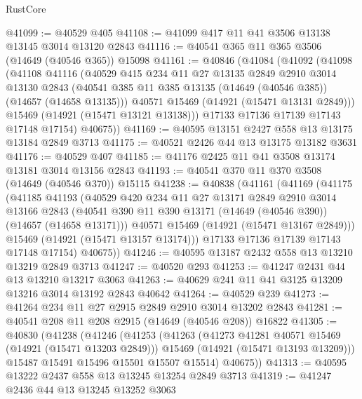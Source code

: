 \begin{lexlean}{RustCore}
\begin{coremodule}
@41099 := @40529 @405
@41108 := @41099 @417 @11 @41 @3506 @13138 @13145 @3014 @13120 @2843
@41116 := @40541 @365 @11 @365 @3506 (@14649 (@40546 @365)) @15098
@41161 := @40846
    (@41084
      (@41092
        (@41098
          (@41108
            @41116
            (@40529
              @415
              @234
              @11
              @27
              @13135
              @2849
              @2910
              @3014
              @13130
              @2843
              (@40541 @385 @11 @385 @13135 (@14649 (@40546 @385)) (@14657 (@14658 @13135)))
              @40571
              @15469
              (@14921 (@15471 @13131 @2849)))
            @15469
            (@14921 (@15471 @13121 @13138)))
          @17133
          @17136
          @17139
          @17143
          @17148
          @17154)
        @40675))
@41169 := @40595 @13151 @2427 @558 @13 @13175 @13184 @2849 @3713
@41175 := @40521 @2426 @44 @13 @13175 @13182 @3631
@41176 := @40529 @407
@41185 := @41176 @2425 @11 @41 @3508 @13174 @13181 @3014 @13156 @2843
@41193 := @40541 @370 @11 @370 @3508 (@14649 (@40546 @370)) @15115
@41238 := @40838
    (@41161
      (@41169
        (@41175
          (@41185
            @41193
            (@40529
              @420
              @234
              @11
              @27
              @13171
              @2849
              @2910
              @3014
              @13166
              @2843
              (@40541 @390 @11 @390 @13171 (@14649 (@40546 @390)) (@14657 (@14658 @13171)))
              @40571
              @15469
              (@14921 (@15471 @13167 @2849)))
            @15469
            (@14921 (@15471 @13157 @13174)))
          @17133
          @17136
          @17139
          @17143
          @17148
          @17154)
        @40675))
@41246 := @40595 @13187 @2432 @558 @13 @13210 @13219 @2849 @3713
@41247 := @40520 @293
@41253 := @41247 @2431 @44 @13 @13210 @13217 @3063
@41263 := @40629 @241 @11 @41 @3125 @13209 @13216 @3014 @13192 @2843 @40642
@41264 := @40529 @239
@41273 := @41264 @234 @11 @27 @2915 @2849 @2910 @3014 @13202 @2843
@41281 := @40541 @208 @11 @208 @2915 (@14649 (@40546 @208)) @16822
@41305 := @40830
    (@41238
      (@41246
        (@41253
          (@41263
            (@41273 @41281 @40571 @15469 (@14921 (@15471 @13203 @2849)))
            @15469
            (@14921 (@15471 @13193 @13209)))
          @15487
          @15491
          @15496
          @15501
          @15507
          @15514)
        @40675))
@41313 := @40595 @13222 @2437 @558 @13 @13245 @13254 @2849 @3713
@41319 := @41247 @2436 @44 @13 @13245 @13252 @3063

\end{coremodule}
\end{lexlean}
